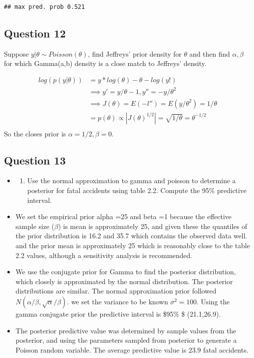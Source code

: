 \documentclass[
]{book}
\providecommand{\tightlist}{%
  \setlength{\itemsep}{0pt}\setlength{\parskip}{0pt}}
\theoremstyle{definition}
\theoremstyle{definition}
\theoremstyle{definition}
\theoremstyle{definition}
\theoremstyle{remark}
\begin{document}
\begin{verbatim}
## max pred. prob 0.521
\end{verbatim}

\hypertarget{question-12}{%
\subsection*{Question 12}\label{question-12}}

Suppose \(y|\theta \sim Poisson(\theta)\), find Jeffreys' prior density for \(\theta\) and then find \(\alpha,\beta\) for which Gamma(a,b) density is a close match to Jeffreys' density.

\[
\begin{aligned}
 log(p(y|\theta))&= y*log(\theta)-\theta -log(y!)\\
 &\implies y' = y/\theta - 1 ,  y'' = -y/\theta^2 \\
 &\implies J(\theta)= E(- l'')= E(y/\theta^2)= 1/\theta \\
 &= p(\theta)\propto |J(\theta)^{1/2}| = \sqrt{1/\theta} = \theta^{-1/2}\\
\end{aligned}
\]
So the closes prior is \(\alpha=1/2 , \beta=0\).

\hypertarget{question-13}{%
\subsection*{Question 13}\label{question-13}}

\begin{itemize}
\item
  \begin{enumerate}
  \def\labelenumi{(\alph{enumi})}
  \tightlist
  \item
    Use the normal approximation to gamma and poisson to determine a posterior for fatal accidents using table 2.2. Compute the 95\(\%\) predictive interval.
  \end{enumerate}
\item
  We set the empirical prior alpha =25 and beta =1 because the effective sample size (\(\beta\)) is mean is approximately 25, and given these the quantiles of the prior distribution is 16.2 and 35.7 which contains the observed data well. and the prior mean is approximately 25 which is reasonably close to the table 2.2 values, although a sensitivity analysis is recommended.
\item
  We use the conjugate prior for Gamma to find the posterior distribution, which closely is approximated by the normal distribution. The posterior distributions are similar. The normal approximation prior followed \(N(\alpha/\beta, \sqrt{\alpha}/\beta)\). we set the variance to be known \(\sigma^2=100\). Using the gamma conjugate prior the predictive interval is \$95\% \$ (21.1,26.9).
\item
  The posterior predictive value was determined by sample values from the posterior, and using the parameters sampled from posterior to generate a Poisson random variable. The average predictive value is 23.9 fatal accidents.
\end{itemize}
\end{document}

